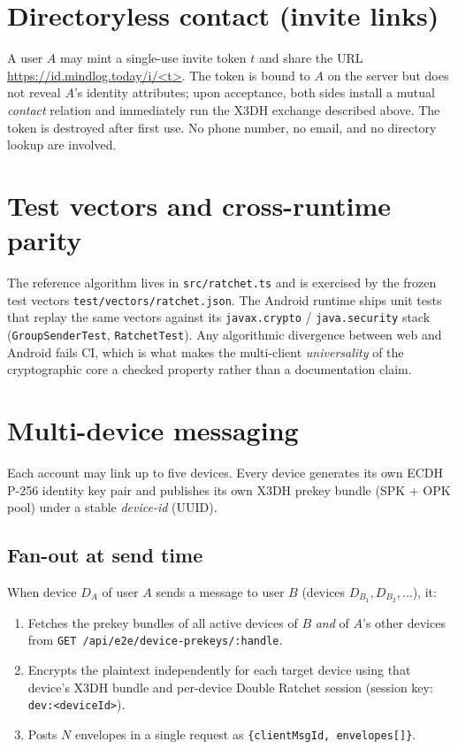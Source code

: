 \documentclass[11pt,a4paper]{article}
\newcommand{\code}[1]{\texttt{\small #1}}
\begin{document}
\section{Directoryless contact (invite links)}

A user $A$ may mint a single-use invite token $t$ and share the URL
\url{https://id.mindlog.today/i/<t>}. The token is bound to $A$ on the
server but does not reveal $A$'s identity attributes; upon acceptance,
both sides install a mutual \emph{contact} relation and immediately run
the X3DH exchange described above. The token is destroyed after first
use. No phone number, no email, and no directory lookup are involved.

\section{Test vectors and cross-runtime parity}

The reference algorithm lives in \code{src/ratchet.ts} and is exercised
by the frozen test vectors \code{test/vectors/ratchet.json}. The Android
runtime ships unit tests that replay the same vectors against its
\code{javax.crypto} / \code{java.security} stack
(\code{GroupSenderTest}, \code{RatchetTest}). Any algorithmic divergence
between web and Android fails CI, which is what makes the multi-client
\emph{universality} of the cryptographic core a checked property rather
than a documentation claim.

\section{Multi-device messaging}

Each account may link up to five devices. Every device generates its
own ECDH P-256 identity key pair and publishes its own X3DH prekey
bundle (SPK + OPK pool) under a stable \emph{device-id} (UUID).

\subsection*{Fan-out at send time}

When device $D_A$ of user $A$ sends a message to user $B$ (devices
$D_{B_1}, D_{B_2}, \ldots$), it:
\begin{enumerate}
  \item Fetches the prekey bundles of all active devices of $B$ \emph{and}
        of $A$'s other devices from \code{GET /api/e2e/device-prekeys/:handle}.
  \item Encrypts the plaintext independently for each target device using
        that device's X3DH bundle and per-device Double Ratchet session
        (session key: \code{dev:<deviceId>}).
  \item Posts $N$ envelopes in a single request as
        \code{\{clientMsgId, envelopes[]\}}.
\end{enumerate}
\end{document}
